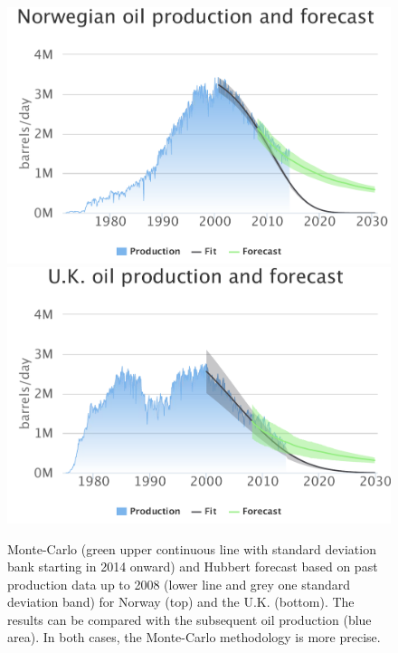 \documentclass[review]{elsarticle}
\begin{document}
\noindent 
\begin{figure}[H]
\includegraphics[width=1\columnwidth]{NO-back-test}
\includegraphics[width=1\columnwidth]{UK-back-test}
\caption{\doublespacing
Monte-Carlo (green upper continuous line with standard deviation bank starting in 2014 onward) and Hubbert forecast based on past production data up to 2008 (lower line and grey one standard deviation band) for Norway (top) and the U.K. (bottom). The results can be compared with the subsequent oil production (blue area). In both cases, the Monte-Carlo methodology is more precise.}
\label{model-back-testing} 
\end{figure}

\pagebreak

\end{document}
